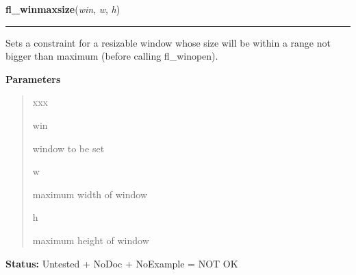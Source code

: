 \hspace{.8\funcindent}\begin{boxedminipage}{\funcwidth}

    \raggedright \textbf{fl\_winmaxsize}(\textit{win}, \textit{w}, \textit{h})

    \vspace{-1.5ex}

    \rule{\textwidth}{0.5\fboxrule}
\setlength{\parskip}{2ex}
    Sets a constraint for a resizable window whose size will be within a 
    range not bigger than maximum (before calling fl\_winopen).

\setlength{\parskip}{1ex}
      \textbf{Parameters}
      \vspace{-1ex}

      \begin{quote}
        \begin{Ventry}{xxx}

          \item[win]

          window to be set

          \item[w]

          maximum width of window

          \item[h]

          maximum height of window

        \end{Ventry}

      \end{quote}

\textbf{Status:} Untested + NoDoc + NoExample = NOT OK



    \end{boxedminipage}

    \label{xformslib:library:fl_winaspect}

    \vspace{0.5ex}

